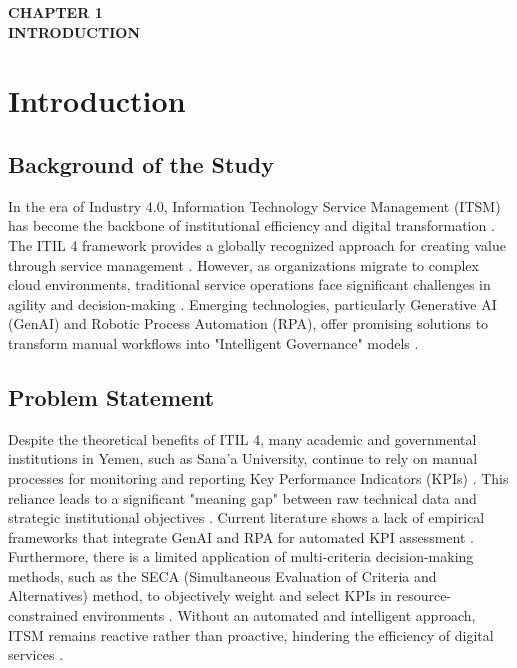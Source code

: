 \documentclass[12pt,a4paper,oneside]{report}
\begin{document}
\setcounter{chapter}{0} 

\clearpage
\thispagestyle{empty} 
\vspace*{\fill}
\begin{center}
    {\Huge\bfseries CHAPTER 1} \\[0.5cm]
    {\Huge\bfseries INTRODUCTION}
\end{center}
\vspace*{\fill}
\clearpage

\chapter{Introduction}

\section{Background of the Study}
In the era of Industry 4.0, Information Technology Service Management (ITSM) has become the backbone of institutional efficiency and digital transformation \cite{almontaser2025}. The ITIL 4 framework provides a globally recognized approach for creating value through service management \cite{almontaser2025}. However, as organizations migrate to complex cloud environments, traditional service operations face significant challenges in agility and decision-making \cite{almontaser2025}. Emerging technologies, particularly Generative AI (GenAI) and Robotic Process Automation (RPA), offer promising solutions to transform manual workflows into "Intelligent Governance" models \cite{almontaser2025}.

\section{Problem Statement}
Despite the theoretical benefits of ITIL 4, many academic and governmental institutions in Yemen, such as Sana'a University, continue to rely on manual processes for monitoring and reporting Key Performance Indicators (KPIs) \cite{almontaser2025}. This reliance leads to a significant "meaning gap" between raw technical data and strategic institutional objectives \cite{almontaser2025}. Current literature shows a lack of empirical frameworks that integrate GenAI and RPA for automated KPI assessment \cite{almontaser2025}. Furthermore, there is a limited application of multi-criteria decision-making methods, such as the SECA (Simultaneous Evaluation of Criteria and Alternatives) method, to objectively weight and select KPIs in resource-constrained environments \cite{almontaser2025}. Without an automated and intelligent approach, ITSM remains reactive rather than proactive, hindering the efficiency of digital services \cite{almontaser2025}.
\end{document}
